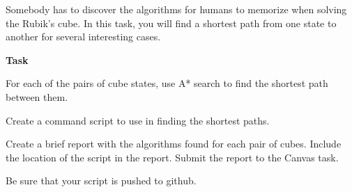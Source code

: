 \begin{problem}{50}

  Somebody has to discover the algorithms for humans to
  memorize when solving the Rubik's cube.  In this
  task, you will find a shortest path from one state
  to another for several interesting cases.

  \vspace{.1in}
  \textbf{Task}

  For each of the pairs of cube states, use A* search
  to find the shortest path between them.

  Create a command script to use in finding the shortest
  paths.
  
  Create a brief report with the algorithms found
  for each pair of cubes.  Include the location of the 
  script in the report. Submit the report to the Canvas task.

  Be sure that your script is pushed to github.

\end{problem}
